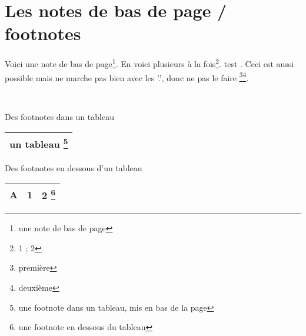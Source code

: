 \section{Les notes de bas de page / footnotes}

Voici une note de bas de page\footnote{une note de bas de page}. En voici plusieurs à la fois\footnote{1 ; 2}. test . Ceci est aussi possible mais ne marche pas bien avec les '.', donc ne pas le faire \footnote{première}\footnote{deuxième}.

~~

Des footnotes dans un tableau 

\begin{savenotes}
	\begin{tabular}{c} 
		\toprule
     	un tableau \footnote{une footnote dans un tableau, mis en bas de la page} \\
		\bottomrule
	\end{tabular}
\end{savenotes}

Des footnotes en dessous d'un tableau 


	\begin{minipage}{3cm}
	\begin{tabular}{lcc}
        \toprule
        A & 1 & 2 \footnote{une footnote en dessous du tableau} \\
        \bottomrule
    \end{tabular}
	\end{minipage}


